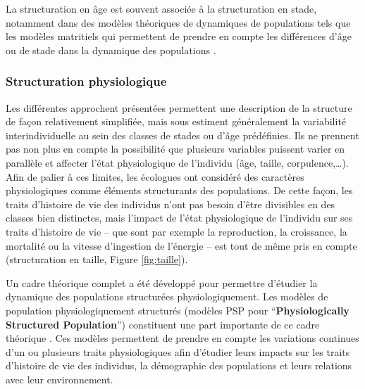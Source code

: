 La structuration en âge est souvent associée à la structuration en stade,
notamment dans des modèles théoriques de dynamiques de populations tels que les
modèles matritiels qui permettent de prendre en compte les différences d'âge ou
de stade dans la dynamique des populations
\autocites{caswell2001a,sarrazin2000demographic}. 

\subsubsection{Structuration physiologique}

Les différentes approchent présentées permettent une description de la structure
de façon relativement simplifiée, mais sous estiment généralement la variabilité
interindividuelle au sein des classes de stades ou d'âge prédéfinies. Ils ne
prennent pas non plus en compte la possibilité que plusieurs variables puissent
varier en parallèle et affecter l'état physiologique de l'individu (âge, taille,
corpulence,\ldots). Afin de palier à ces limites, les écologues ont considéré
des caractères physiologiques comme éléments structurants des populations. De cette façon, les traits
d'histoire de vie des individus n'ont pas besoin d'être divisibles en des
classes bien distinctes, mais l'impact de l'état physiologique de l'individu sur
ses traits d'histoire de vie -- que sont par exemple la reproduction, la
croissance, la mortalité ou la vitesse d'ingestion de l'énergie -- est tout de
même pris en compte 
(structuration en taille, Figure \ref{fig:taille}).

Un cadre théorique complet a été développé pour permettre d'étudier la dynamique
des populations structurées physiologiquement. Les modèles de
population physiologiquement structurés (modèles PSP pour
``\textbf{Physiologically Structured Population}'') constituent une part
importante de ce cadre théorique \autocites{metz1986a,de-roos1992a,de-roos1997a}. Ces modèles permettent de
prendre en compte les variations continues d'un ou plusieurs traits
physiologiques afin d'étudier leurs impacts sur les traits d'histoire de vie
des individus, la démographie des populations et leurs relations avec leur
environnement.

